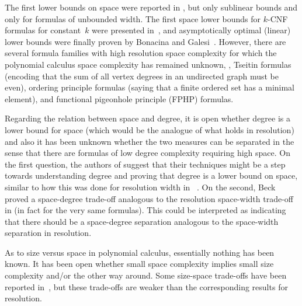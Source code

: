 \documentclass{toc}
\begin{document}
The first lower bounds on space were reported in
\cite{ABRW02SpaceComplexity},
but only sublinear bounds and only for
formulas of unbounded width. The first space lower bounds for
\mbox{$k$-CNF} formulas
%
%
for constant~$k$ were presented in~\cite{FLNRT15SpaceCplx},
and asymptotically optimal (linear) lower bounds
were finally proven by
Bonacina and Galesi~\cite{BG15Framework}.
However, there are several formula families with high resolution space complexity
for which the 
%
polynomial calculus   
space complexity has remained unknown,
%
\eg,     %
Tseitin formulas (encoding
%
that the sum of all vertex
degrees in an undirected graph must be even), 
ordering principle formulas
%
(saying that a finite ordered set has a minimal element),
and 
%
functional pigeonhole principle (FPHP) formulas.

Regarding the relation between space and degree, it is open whether
degree is a lower bound for space 
(which would be the analogue of what holds in resolution)
and also it has been unknown whether the two
measures can be separated in the sense that there are formulas of low
degree complexity requiring high space.
%
On the first question, the authors of \cite{BG15Framework} suggest
that their techniques might be a step towards understanding degree and
proving that degree %
is a lower bound on  %
space, similar to how this was done
for resolution width in~%
\cite{AD08CombinatoricalCharacterization}.
%
On the second, Beck \etal~\cite{BNT13SomeTradeoffs} proved a
space-degree trade-off analogous to the resolution space-width
trade-off in \cite{Ben-Sasson09SizeSpaceTradeoffs} (in fact for the
very same formulas).  This
%
could be interpreted as indicating that there should be a space-degree
separation analogous to the space-width separation in resolution.


As to size versus space in 
%
polynomial calculus,   
essentially nothing has been known.
It 
%
has been 
open whether small space complexity implies small size
complexity and/or the other way around.
Some size-space trade-offs 
%
%
have been
reported in~\cite{BNT13SomeTradeoffs,HN12VirtueSuccinctProofs},
but these trade-offs are weaker than the corresponding results for
resolution. 

\label{sec:intro-our-results}
\end{document}
